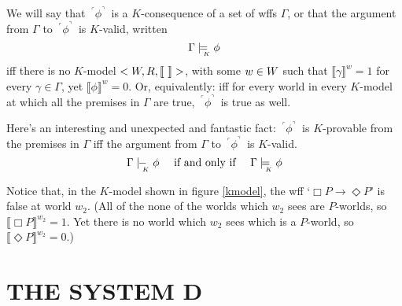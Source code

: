 \documentclass[landscape, two column, full page,reqno]{article}
\let\mathcal\relax
\newcommand{\mathcal}{\OMScal}%
\newcommand{\p}{\item}
\newcommand{\fns}[1]{{\footnotesize #1}}
\newcommand{\qq}[1]{ ~\!^\ulcorner #1  ^\urcorner~\!}
\newcommand{\V}[1]{\llbracket #1 \rrbracket}
\newcommand{\kmodels}{\models_{\!\!\!\raisebox{-3pt}{\text{\tiny$K$}}}}
\newcommand{\kproves}{\mid\hspace{-3.9pt}-_{\!\!\!\raisebox{-3pt}{\text{\tiny$K$}}}\hspace{3pt}}
\newcommand{\D}{\Diamond}
\newcommand{\B}{\Box}
\begin{document}
\p We will say that $\qq{\phi}$ is a $K$-consequence of a set of wffs $\Gamma$, or that the argument from $\Gamma$ to $\qq{\phi}$ is $K$-valid, written
	\[
	\Gamma \kmodels \phi
	\]
iff there is no $K$-model $< \mathcal{W}, R, \V{~} >$, with some $w \in \mathcal{W}$ such that $\V{\gamma}^w = 1$ for every $\gamma \in \Gamma$, yet $\V{\phi}^w = 0$.  Or, equivalently: iff for every  world  in every $K$-model at which all the premises in $\Gamma$ are true, $\qq{\phi}$ is true as well.


\p Here's an interesting and unexpected and fantastic fact: $\qq{\phi}$ is $K$-provable from the premises in  $\Gamma$ iff the argument from $\Gamma$ to $\qq{\phi}$ is $K$-valid.
			\[
			\Gamma \kproves \phi \quad \mbox{ if and only if } \quad \Gamma \kmodels \phi
			\]
\p Notice that, in the $K$-model shown in figure \ref{kmodel}, the wff `$\B P \to \D P$' is false at world $w_2$.  (All of the none of the worlds which $w_2$ sees are $P$-worlds, so $\V{\B P}^{w_2} = 1$.  Yet there is no world which $w_2$ sees which is a $P$-world, so $\V{ \D P}^{w_2} = 0$.)

\section{T\fns{HE} S\fns{YSTEM} D}
\end{document}
